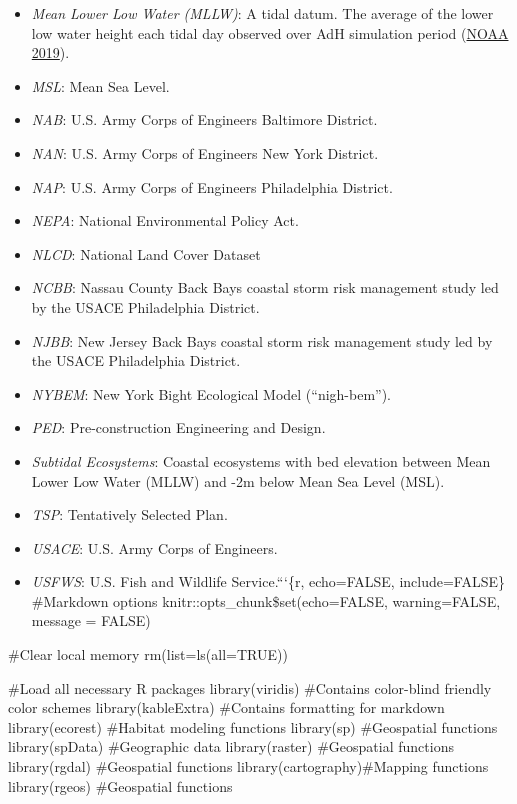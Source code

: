 \documentclass[
]{book}
\begin{document}
\begin{itemize}
\item
  \emph{Mean Lower Low Water (MLLW)}: A tidal datum. The average of the lower low water height each tidal day observed over AdH simulation period (\href{https://shoreline.noaa.gov/glossary.html}{NOAA 2019}).
\item
  \emph{MSL}: Mean Sea Level.
\item
  \emph{NAB}: U.S. Army Corps of Engineers Baltimore District.\\
\item
  \emph{NAN}: U.S. Army Corps of Engineers New York District.\\
\item
  \emph{NAP}: U.S. Army Corps of Engineers Philadelphia District.\\
\item
  \emph{NEPA}: National Environmental Policy Act.
\item
  \emph{NLCD}: National Land Cover Dataset\\
\item
  \emph{NCBB}: Nassau County Back Bays coastal storm risk management study led by the USACE Philadelphia District.\\
\item
  \emph{NJBB}: New Jersey Back Bays coastal storm risk management study led by the USACE Philadelphia District.\\
\item
  \emph{NYBEM}: New York Bight Ecological Model (``nigh-bem'').\\
\item
  \emph{PED}: Pre-construction Engineering and Design.
\item
  \emph{Subtidal Ecosystems}: Coastal ecosystems with bed elevation between Mean Lower Low Water (MLLW) and -2m below Mean Sea Level (MSL).
\item
  \emph{TSP}: Tentatively Selected Plan.
\item
  \emph{USACE}: U.S. Army Corps of Engineers.\\
\item
  \emph{USFWS}: U.S. Fish and Wildlife Service.```\{r, echo=FALSE, include=FALSE\}
  \#Markdown options
  knitr::opts\_chunk\$set(echo=FALSE, warning=FALSE, message = FALSE)
\end{itemize}

\#Clear local memory
rm(list=ls(all=TRUE))

\#Load all necessary R packages
library(viridis) \#Contains color-blind friendly color schemes
library(kableExtra) \#Contains formatting for markdown
library(ecorest) \#Habitat modeling functions
library(sp) \#Geospatial functions
library(spData) \#Geographic data
library(raster) \#Geospatial functions
library(rgdal) \#Geospatial functions
library(cartography)\#Mapping functions
library(rgeos) \#Geospatial functions
\end{document}
